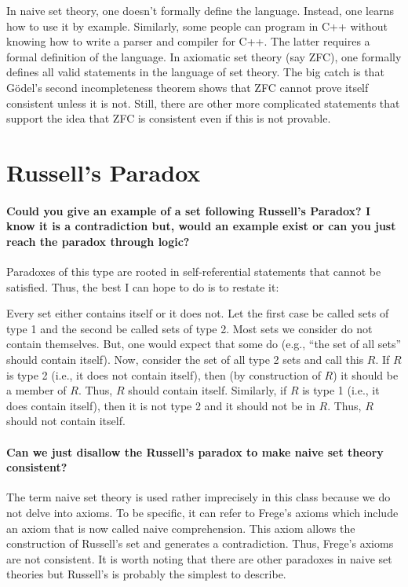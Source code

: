 \documentclass[10pt,english]{article}
\begin{document}
In naive set theory, one doesn't formally define the language.
Instead, one learns how to use it by example.
Similarly, some people can program in C++ without knowing how to write a parser and compiler for C++.
The latter requires a formal definition of the language.
In axiomatic set theory (say ZFC), one formally defines all valid statements in the language of set theory.
The big catch is that G\"{o}del's second incompleteness theorem shows that ZFC cannot prove itself consistent unless it is not.
Still, there are other more complicated statements that support the idea that ZFC is consistent even if this is not provable.

\section{Russell's Paradox}

\paragraph{Could you give an example of a set following Russell's Paradox? I know it is a contradiction but, would an example exist or can you just reach the paradox through logic?}

Paradoxes of this type are rooted in self-referential statements that cannot be satisfied.
Thus, the best I can hope to do is to restate it:

Every set either contains itself or it does not.
Let the first case be called sets of type 1 and the second be called sets of type 2.
Most sets we consider do not contain themselves.
But, one would expect that some do (e.g., ``the set of all sets'' should contain itself).
Now, consider the set of all type 2 sets and call this $R$.
If $R$ is type 2 (i.e., it does not contain itself), then (by construction of $R$) it should be a member of $R$.
Thus, $R$ should contain itself.
Similarly, if $R$ is type 1 (i.e., it does contain itself), then it is not type 2 and it should not be in $R$.
Thus, $R$ should not contain itself.

\paragraph{Can we just disallow the Russell's paradox to make naive set theory consistent?}

The term naive set theory is used rather imprecisely in this class because we do not delve into axioms.
To be specific, it can refer to Frege's axioms which include an axiom that is now called naive comprehension.
This axiom allows the construction of Russell's set and generates a contradiction.
Thus, Frege's axioms are not consistent.
It is worth noting that there are other paradoxes in naive set theories but Russell's is probably the simplest to describe.
\end{document}
